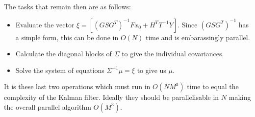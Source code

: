 \documentclass{article}
\begin{document}
The tasks that remain then are as follows:
\begin{itemize}
  \item Evaluate the vector $\xi = \left[ (GSG^T)^{-1} F x_0 + H^T T^{-1} Y \right]$. Since $(GSG^T)^{-1}$ has a simple
      form, this can be done in $O(N)$ time and is embarassingly parallel.
  \item Calculate the diagonal blocks of $\Sigma$ to give the individual covariances.
  \item Solve the system of equations $\Sigma^{-1} \mu = \xi$ to give us $\mu$.
\end{itemize}
It is these last two operations which must run in $O(NM^3)$ time to equal the complexity of the Kalman filter. Ideally
they should be parallelisable in $N$ making the overall parallel algorithm $O(M^3)$.
\end{document}
